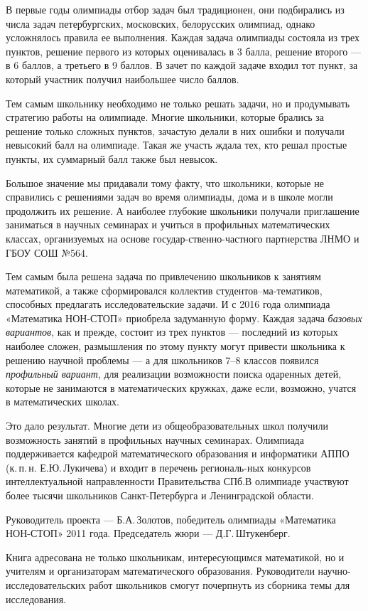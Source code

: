 \ms\abz В первые годы олимпиады отбор задач был традиционен, они подбирались из числа задач петербургских, московских, белорусских олимпиад, однако усложнялось правила ее выполнения. Каждая задача олимпиады состояла из трех пунктов, решение первого из которых оценивалась в 3 балла, решение второго — в 6 баллов, а третьего в 9 баллов. В зачет по каждой задаче входил тот пункт, за который участник получил наибольшее число баллов.

\ms\abz Тем самым школьнику необходимо не только решать задачи, но и продумывать стратегию работы на олимпиаде. Многие школьники, которые брались за решение только сложных пунктов, зачастую делали в них ошибки и получали невысокий балл на олимпиаде. Такая же участь ждала тех, кто решал простые пункты, их суммарный балл также был невысок.

\ms\abz Большое значение мы придавали тому факту, что школьники, которые не справились с решениями задач во время олимпиады, дома и в школе могли продолжить их решение. А наиболее глубокие школьники получали приглашение заниматься в научных семинарах и учиться в профильных математических классах, организуемых на основе государ-\linebreak ственно-частного партнерства ЛНМО и ГБОУ СОШ №564.

\ms\abz Тем самым была решена задача по привлечению школьников к занятиям математикой, а также сформировался коллектив студентов–ма-\linebreak тематиков, способных предлагать исследовательские задачи. И с 2016 года олимпиада «Математика НОН-СТОП» приобрела задуманную форму. Каждая задача {\itshape базовых вариантов}, как и прежде, состоит из трех пунктов — последний из которых наиболее сложен, размышления по этому пункту могут привести школьника к решению научной проблемы — а для школьников 7–8 классов появился {\itshape профильный вариант}, для реализации возможности поиска одаренных детей, которые не занимаются в математических кружках, даже если, возможно, учатся в математических школах.

\ms\abz Это дало результат. Многие дети из общеобразовательных школ получили возможность занятий в профильных научных семинарах. Олимпиада поддерживается кафедрой математического образования и информатики АППО (к.\,п.\,н. Е.Ю.\,Лукичева) и входит в перечень региональ-\linebreak ных конкурсов интеллектуальной направленности Правительства СПб.\linebreak В олимпиаде участвуют более тысячи школьников Санкт-Петербурга и Ленинградской области.

\ms\abz Руководитель проекта — Б.А.\,Золотов, победитель олимпиады «Математика НОН-СТОП» 2011 года. Председатель жюри — Д.Г.\,Штукенберг.   

\ms\abz Книга адресована не только школьникам, интересующимся математикой, но и учителям и организаторам математического образования. Руководители научно-исследовательских работ школьников смогут почерпнуть из сборника темы для исследования. 